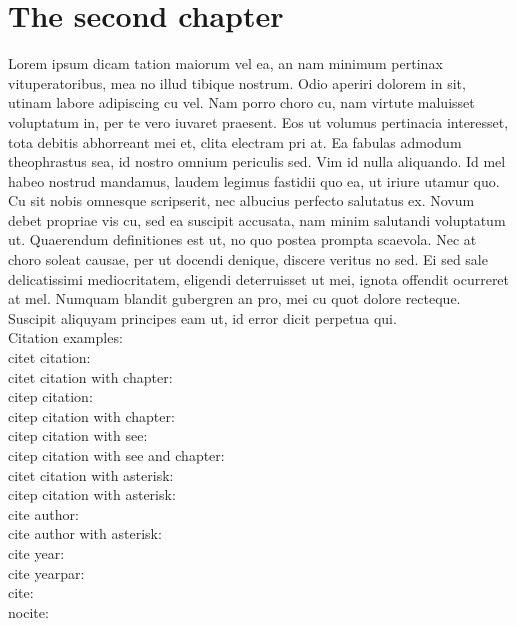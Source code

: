\chapter{The second chapter}

Lorem ipsum dicam tation maiorum vel ea, an nam minimum pertinax vituperatoribus, mea no illud tibique nostrum. Odio aperiri dolorem in sit, utinam labore adipiscing cu vel. Nam porro choro cu, nam virtute maluisset voluptatum in, per te vero iuvaret praesent. Eos ut volumus pertinacia interesset, tota debitis abhorreant mei et, clita electram pri at. Ea fabulas admodum theophrastus sea, id nostro omnium periculis sed. Vim id nulla aliquando. Id mel habeo nostrud mandamus, laudem legimus fastidii quo ea, ut iriure utamur quo.\\

Cu sit nobis omnesque scripserit, nec albucius perfecto salutatus ex. Novum debet propriae vis cu, sed ea suscipit accusata, nam minim salutandi voluptatum ut. Quaerendum definitiones est ut, no quo postea prompta scaevola. Nec at choro soleat causae, per ut docendi denique, discere veritus no sed. Ei sed sale delicatissimi  mediocritatem, eligendi deterruisset ut mei, ignota offendit ocurreret at mel. Numquam blandit gubergren an pro, mei cu quot dolore recteque. Suscipit aliquyam principes eam ut, id error dicit perpetua qui.\\

Citation examples:\\
citet citation: \citet{Aly2012} \\
citet citation with chapter: \citet[chap. 2]{Aly2012} \\
citep citation: \citep{Aly2012} \\
citep citation with chapter: \citep[chap. 2]{Aly2012} \\
citep citation with see: \citep[see][]{Aly2012} \\
citep citation with see and chapter: \citep[see][chap. 2]{Aly2012} \\
citet citation with asterisk: \citet*{Aly2012} \\
citep citation with asterisk: \citep*{Aly2012} \\
cite author: \citeauthor{Aly2012} \\
cite author with asterisk: \citeauthor*{Aly2012} \\
cite year: \citeyear{Aly2012} \\
cite yearpar: \citeyearpar{Aly2012} \\
cite: \cite{Aly2012} \\
nocite: \nocite{Bing}